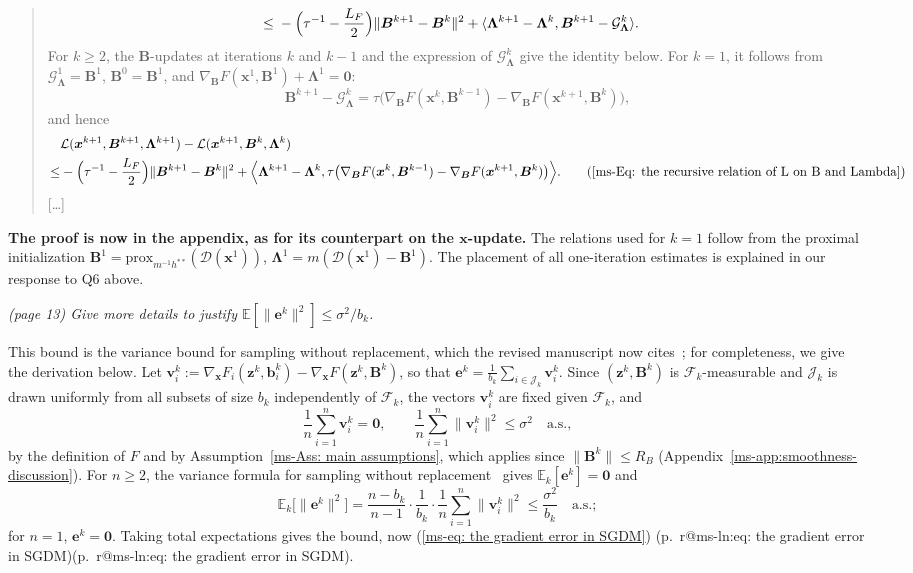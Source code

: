 \documentclass[11pt]{article}
\makeatletter
\newcommand{\mref}[1]{\ref*{ms-#1}}
\newcommand{\mpage}[1]{\pageref*{ms-#1}}
\newcommand{\meq}[1]{(\mref{#1})}
\newcommand{\mhasline}[1]{\ifcsname r@ms-ln:#1\endcsname\expandafter\@firstoftwo\else\expandafter\@secondoftwo\fi}
\newcommand{\mline}[1]{\getrefnumber{ms-ln:#1}}
\newcommand{\mpl}[1]{p.~\mpage{#1}\mhasline{#1}{, line~\mline{#1}}{}}
\newcommand{\EE}{\mathbb{E}}
\newcommand{\prox}{\mathrm{prox}}
\newcommand{\zero}{\bm{0}}
\newcommand{\calD}{\mathcal{D}}
\newcommand{\calJ}{\mathcal{J}}
\newcommand{\calL}{\mathcal{L}}
\newcommand{\calG}{\mathcal{G}}
\newcommand{\calF}{\mathcal{F}}
\newcommand{\bB}{\bm{B}}
\newcommand{\bLmbd}{\bm{\Lambda}}
\newcommand{\bx}{\bm{x}}
\newcommand{\bz}{\bm{z}}
\newcommand{\be}{\bm{e}}
\newcommand{\bb}{\bm{b}}
\newcommand{\bv}{\bm{v}}
\newcommand{\blue}[1]{{\ifmmode\color{blue}#1\else\normalfont\upshape\color{blue}#1\fi}}
\newenvironment{bluequote}{\begin{quote}\normalfont\upshape\color{blue}}{\end{quote}}
\newcommand{\newred}[1]{{\color{red}#1}}
\let\reviewitem\item
\newenvironment{qalist}{\begin{description}[leftmargin=0pt,labelindent=0pt,itemsep=0.8em,parsep=0.5em,font=\normalfont\upshape\bfseries]}{\end{description}}
\makeatother
\begin{document}
\begin{qalist}
\begin{enumerate}[label={[\roman*]},before=\let\item\reviewitem]
\begin{bluequote}
\[\begin{aligned}
        \le{}&-\Bigl(\tau^{-1}-\frac{L_F}{2}\Bigr)\|\bB^{k+1}-\bB^{k}\|^{2}+\langle\bLmbd^{k+1}-\bLmbd^{k},\bB^{k+1}-\calG_{\bLmbd}^{k}\rangle.
        \end{aligned}
    \]
    For $k\ge2$, the $\bB$-updates at iterations $k$ and $k-1$ and the expression of $\calG_{\bLmbd}^{k}$ give the identity below. For $k=1$, it follows from $\calG_{\bLmbd}^{1}=\bB^1$, $\bB^0=\bB^1$, and $\nabla_{\bB}F(\bx^1,\bB^1)+\bLmbd^1=\zero$:
    \[
        \bB^{k+1}-\calG_{\bLmbd}^{k}=\tau\bigl(\nabla_{\bB}F(\bx^{k},\bB^{k-1})-\nabla_{\bB}F(\bx^{k+1},\bB^{k})\bigr),
    \]
    and hence
\begin{align*}
&\calL(\bx^{k+1},\bB^{k+1},\bLmbd^{k+1})-\calL(\bx^{k+1},\bB^{k},\bLmbd^{k})\\
\le&-\Bigl(\tau^{-1}-\frac{L_F}{2}\Bigr)\|\bB^{k+1}-\bB^{k}\|^{2}+\Bigl\langle\bLmbd^{k+1}-\bLmbd^{k},\tau\bigl(\nabla_{\bB}F(\bx^{k},\bB^{k-1})-\nabla_{\bB}F(\bx^{k+1},\bB^{k})\bigr)\Bigr\rangle.\tag{\mref{Eq: the recursive relation of L on B and Lambda}}
\end{align*}
[\ldots]
\end{bluequote}
\item \textbf{The proof is now in the appendix, as for its counterpart on the $\bx$-update.} The relations used for $k=1$ follow from the proximal initialization $\bB^1=\prox_{m^{-1}h^{**}}(\calD(\bx^1))$, $\bLmbd^1=m(\calD(\bx^1)-\bB^1)$. The placement of all one-iteration estimates is explained in our response to Q6 above.
\end{enumerate}

\item[{Q43.}] {\itshape {\itshape (page 13) Give more details to justify
$\EE[\|\be^k\|^2]\le\sigma^2/b_k$.}}
\item[Response:] \newred{This bound is the} variance bound for sampling without replacement, which the revised manuscript now cites~\cite[Chapter~2]{cochran1977sampling}; for completeness, we give the derivation below. Let $\bv_i^k:=\nabla_{\bx}F_i(\bz^k,\bb_i^k)-\nabla_{\bx}F(\bz^k,\bB^k)$, so that $\be^k=\frac{1}{b_k}\sum_{i\in\calJ_k}\bv_i^k$. Since $(\bz^k,\bB^k)$ is $\calF_k$-measurable and $\calJ_k$ is drawn uniformly from all subsets of size $b_k$ independently of $\calF_k$, the vectors $\bv_i^k$ are fixed given $\calF_k$, and
\[
\frac{1}{n}\sum_{i=1}^n\bv_i^k=\zero,\qquad
\frac{1}{n}\sum_{i=1}^n\|\bv_i^k\|^2\le\sigma^2\quad\text{a.s.},
\]
by the definition of $F$ and by Assumption~\mref{Ass: main assumptions}, which applies since $\|\bB^k\|\le R_B$ (Appendix~\mref{app:smoothness-discussion}). For $n\ge2$, the variance formula for sampling without replacement~\cite{cochran1977sampling} gives $\EE_k[\be^k]=\zero$ and
\[
\EE_k\bigl[\|\be^k\|^2\bigr]=\frac{n-b_k}{n-1}\cdot\frac{1}{b_k}\cdot\frac{1}{n}\sum_{i=1}^n\|\bv_i^k\|^2\le\frac{\sigma^2}{b_k}\quad\text{a.s.};
\]
for $n=1$, $\be^k=\zero$. Taking total expectations gives the bound, now \meq{eq: the gradient error in SGDM} \blue{(\mpl{eq: the gradient error in SGDM})}.


\end{qalist}
\end{document}
